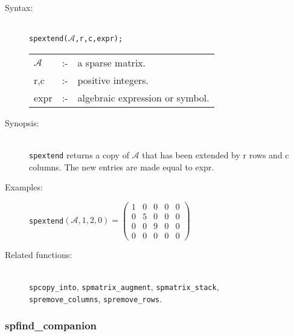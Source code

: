 \begin{description}
\item[Syntax:]\mbox{}\\
 \texttt{spextend($\mathcal{A}$,r,c,expr);}\\[2mm]
\begin{tabular}{l l l}
$\mathcal{A}$ &:-& a sparse matrix. \\
r,c        &:-& positive integers. \\
expr      &:-& algebraic expression or symbol.
\end{tabular}

\item[Synopsis:]\mbox{}\\
                \texttt{spextend} returns a copy of $\mathcal{A}$ that has been
                extended by r rows and c columns. The new entries are
                made equal to expr.

\item[Examples:]
\texttt{spextend}\((\mathcal{A},1,2,0) =
\begin{pmatrix} 1 & 0 & 0 & 0 & 0 \\ 0 & 5 & 0 & 0 & 0
\\ 0 & 0 & 9 & 0 & 0 \\ 0 & 0 & 0 & 0 & 0
\end{pmatrix}\)

\item[Related functions:]\mbox{}\\
\texttt{spcopy\_into}, \texttt{spmatrix\_augment},
\texttt{spmatrix\_stack},\\ \texttt{spremove\_columns},
\texttt{spremove\_rows}.

\end{description}


\subsubsection{spfind\_companion}
\label{sparse:spfind_companion}
\hypertarget{operator:SPFIND_COMPANION}{}

